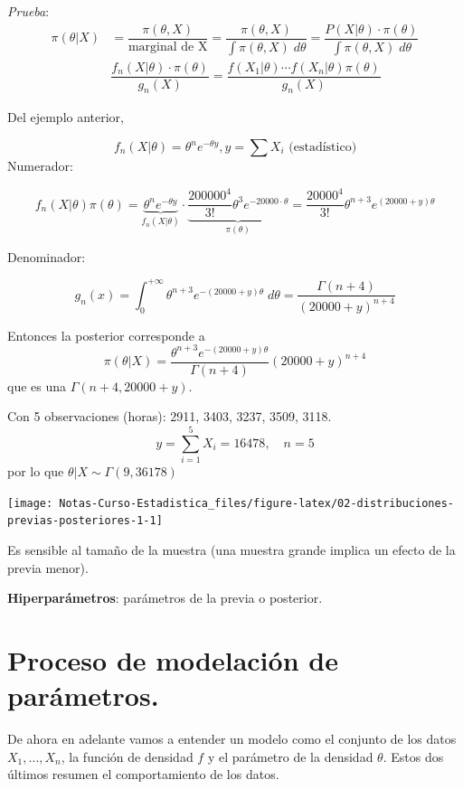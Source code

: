 \documentclass[
  12pt,
]{book}
\begin{document}
\emph{Prueba}:
\begin{align*}
\pi(\theta|X) & = \dfrac{\pi(\theta,X)}{\text{marginal de X}} = \dfrac{\pi(\theta,X)}{\int \pi(\theta,X)\;d\theta}= \dfrac{P(X|\theta)\cdot \pi(\theta)}{\int \pi(\theta,X)\;d\theta}\\
& \dfrac{f_n(X|\theta)\cdot \pi(\theta)}{g_n(X)} = \dfrac{f(X_1|\theta)\cdots f(X_n|\theta)\pi(\theta)}{g_n(X)}
\end{align*}

Del ejemplo anterior,

\[f_n(X|\theta) = \theta^n e^{-\theta y}, y = \sum{X_i} \text{ (estadístico})\]
Numerador:

\[f_n(X|\theta)\pi(\theta) = \underbrace{\theta^n e^{-\theta y}}_{f_n(X|\theta)} \cdot \underbrace{\dfrac{200000^4}{3!}\theta^3e^{-20000\cdot\theta}}_{\pi(\theta)} = \dfrac{20000^4}{3!}\theta^{n+3}e^{(20000+y)\theta}\]

Denominador:

\[g_n(x) = \int_{0}^{+\infty}\theta^{n+3}e^{-(20000+y)\theta}\;d\theta = \dfrac{\Gamma(n+4)}{(20000+y)^{n+4}}\]

Entonces la posterior corresponde a
\[\pi(\theta|X) = \dfrac{\theta^{n+3}e^{-(20000+y)\theta}}{\Gamma(n+4)} (20000+y)^{n+4}\]
que es una \(\Gamma(n+4,20000+y)\).

Con 5 observaciones (horas): 2911, 3403, 3237, 3509, 3118.
\[y = \sum_{i=1}^{5}X_i = 16478, \quad n= 5\]
por lo que \(\theta|X \sim \Gamma(9,36178)\)

\begin{center}\texttt{[image: Notas-Curso-Estadistica\_files/figure-latex/02-distribuciones-previas-posteriores-1-1]} \end{center}

Es sensible al tamaño de la muestra (una muestra grande implica un efecto de la previa menor).

\textbf{Hiperparámetros}: parámetros de la previa o posterior.

\hypertarget{proceso-de-modelaciuxf3n-de-paruxe1metros.}{%
\section{Proceso de modelación de parámetros.}\label{proceso-de-modelaciuxf3n-de-paruxe1metros.}}

De ahora en adelante vamos a entender un modelo como el conjunto de los datos
\(X_1, \ldots, X_n\), la función de densidad \(f\) y el parámetro de la densidad
\(\theta\). Estos dos últimos resumen el comportamiento de los datos.
\end{document}
